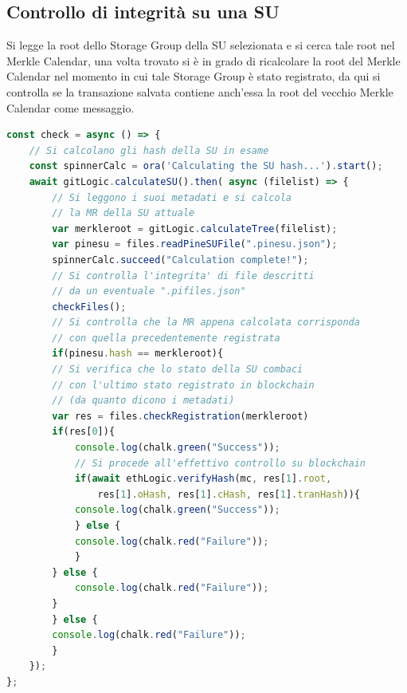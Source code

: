 \subsection{Controllo di integrità su una SU}
Si legge la root dello Storage Group della SU selezionata e si cerca tale root nel Merkle Calendar, una volta trovato si è in grado di ricalcolare la root del Merkle Calendar nel momento in cui tale Storage Group è stato registrato, da qui si controlla se la transazione salvata contiene anch’essa la root del vecchio Merkle Calendar come messaggio.

\newpage

\begin{lstlisting}[language=JavaScript]
const check = async () => {
    // Si calcolano gli hash della SU in esame
    const spinnerCalc = ora('Calculating the SU hash...').start();
    await gitLogic.calculateSU().then( async (filelist) => {
        // Si leggono i suoi metadati e si calcola
        // la MR della SU attuale
        var merkleroot = gitLogic.calculateTree(filelist);
        var pinesu = files.readPineSUFile(".pinesu.json");
        spinnerCalc.succeed("Calculation complete!");
        // Si controlla l'integrita' di file descritti
        // da un eventuale ".pifiles.json"
        checkFiles();
        // Si controlla che la MR appena calcolata corrisponda
        // con quella precedentemente registrata
        if(pinesu.hash == merkleroot){
        // Si verifica che lo stato della SU combaci
        // con l'ultimo stato registrato in blockchain
        // (da quanto dicono i metadati)
        var res = files.checkRegistration(merkleroot)
        if(res[0]){
            console.log(chalk.green("Success"));
            // Si procede all'effettivo controllo su blockchain
            if(await ethLogic.verifyHash(mc, res[1].root,
                res[1].oHash, res[1].cHash, res[1].tranHash)){
            console.log(chalk.green("Success"));
            } else {
            console.log(chalk.red("Failure"));
            }
        } else {
            console.log(chalk.red("Failure"));
        }
        } else {
        console.log(chalk.red("Failure"));
        }
    });
};
\end{lstlisting}